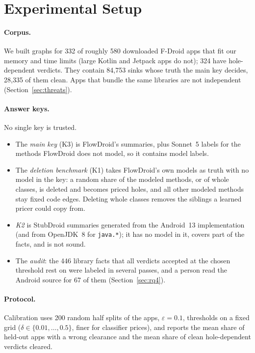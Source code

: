 \section{Experimental Setup}
\label{sec:setup}
\paragraph{Corpus.}
We built graphs for 332 of roughly 580 downloaded F-Droid apps that fit our memory and time limits (large Kotlin and Jetpack apps do not); 324 have hole-dependent verdicts.
They contain 84{,}753 sinks whose truth the main key decides, 28{,}335 of them clean.
Apps that bundle the same libraries are not independent (Section~\ref{sec:threats}).


\paragraph{Answer keys.}
No single key is trusted.
\begin{itemize}
\item The \emph{main key} (K3) is FlowDroid's summaries, plus Sonnet~5 labels for the methods FlowDroid does not model, so it contains model labels.
\item The \emph{deletion benchmark} (K1) takes FlowDroid's own models as truth with no model in the key: a random share of the modeled methods, or of whole classes, is deleted and becomes priced holes, and all other modeled methods stay fixed code edges.
Deleting whole classes removes the siblings a learned pricer could copy from.
\item \emph{K2} is StubDroid summaries generated from the Android~13 implementation (and from OpenJDK~8 for \texttt{java.*}); it has no model in it, covers part of the facts, and is not sound.
\item The \emph{audit}: the 446 library facts that all verdicts accepted at the chosen threshold rest on were labeled in several passes, and a person read the Android source for 67 of them (Section~\ref{sec:rq4}).
\end{itemize}

\paragraph{Protocol.}
Calibration uses 200 random half splits of the apps, $\varepsilon=0.1$, thresholds on a fixed grid ($\delta\in\{0.01,\dots,0.5\}$, finer for classifier prices), and reports the mean share of held-out apps with a wrong clearance and the mean share of clean hole-dependent verdicts cleared.

